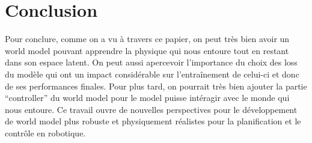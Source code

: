 \documentclass[11pt]{article}
\begin{document}
\section{Conclusion}
\label{sec:conclusion}
Pour conclure, comme on a vu à travers ce papier, on peut très bien avoir un world model pouvant apprendre la physique qui nous entoure tout en restant dans son espace latent. On peut aussi apercevoir l'importance du choix des loss du modèle qui ont un impact considérable sur l'entraînement de celui-ci et donc de ses performances finales. Pour plus tard, on pourrait très bien ajouter la partie ``controller'' du world model pour le model puisse intéragir avec le monde qui nous entoure. Ce travail ouvre de nouvelles perspectives pour le développement de world model plus robuste et physiquement réalistes pour la planification et le contrôle en robotique.



\end{document}

